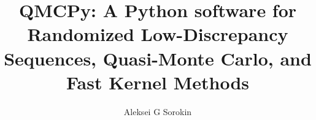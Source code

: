 \documentclass[acmsmall]{acmart}
\begin{document}
\title{QMCPy: A Python software for Randomized Low-Discrepancy Sequences, Quasi-Monte Carlo, and Fast Kernel Methods}

\author{Aleksei G Sorokin}


\end{document}
